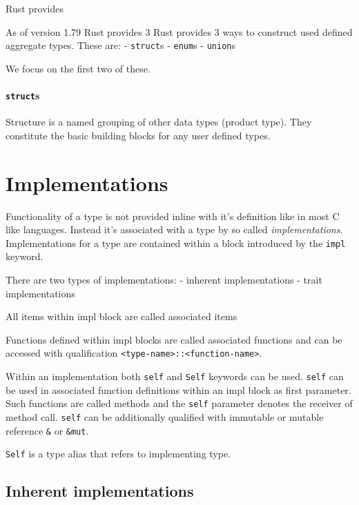 Rust provides 

As of version 1.79 Rust provides 3 Rust provides 3 ways to construct used defined aggregate types.
These are:
- \texttt{struct}s
- \texttt{enum}s
- \texttt{union}s

We focus on the first two of these.

\paragraph{\texttt{struct}s}

Structure is a named grouping of other data types (product type). They constitute the basic building blocks for any user defined types.

\section{Implementations}


Functionality of a type is not provided inline with it's definition like in most C like languages. 
Instead it's associated with a type by so called \textit{implementations}.
Implementations for a type are contained within a block introduced by the \texttt{impl} keyword.

There are two types of implementations:
- inherent implementations
- trait implementations

All items within impl block are called associated items

Functions defined within impl blocks are called associated functions and can be accessed with qualification \texttt{<type-name>::<function-name>}.

Within an implementation both \texttt{self} and \texttt{Self} keywords can be used.
\texttt{self} can be used in associated function definitions within an impl block as first parameter. 
Such functions are called methods and the \texttt{self} parameter denotes the receiver of method call. 
\texttt{self} can be additionally qualified with immutable or mutable reference \texttt{\&} or \texttt{\&mut}.

\texttt{Self} is a type alias that refers to implementing type.


\subsection{Inherent implementations}

